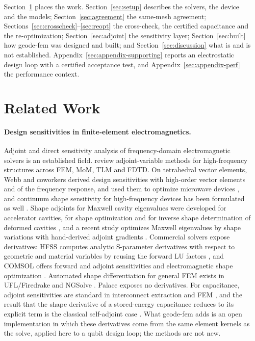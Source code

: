 \documentclass{anvil-paper}
\begin{document}
Section~\ref{sec:related} places the work. Section~\ref{sec:setup}
describes the solvers, the device and the models;
Section~\ref{sec:agreement} the same-mesh agreement;
Sections~\ref{sec:crosscheck}--\ref{sec:reopt} the cross-check, the
certified capacitance and the re-optimization;
Section~\ref{sec:adjoint} the sensitivity layer;
Section~\ref{sec:built} how geode-fem was designed and built; and
Section~\ref{sec:discussion} what is and is not established.
Appendix~\ref{sec:appendix-supporting} reports an electrostatic design
loop with a certified acceptance test, and
Appendix~\ref{sec:appendix-perf} the performance context.

\section{Related Work}
\label{sec:related}

\paragraph{Design sensitivities in finite-element electromagnetics.}
Adjoint and direct sensitivity analysis of frequency-domain
electromagnetic solvers is an established field. \citet{nikolova2004adjoint}
review adjoint-variable methods for high-frequency structures across FEM,
MoM, TLM and FDTD. On tetrahedral vector elements, Webb and coworkers
derived design sensitivities with high-order vector elements and of the
frequency response, and used them to optimize microwave devices
\citep{webb2001design,webb2002design,nair2003optimization}, and continuum
shape sensitivity for high-frequency devices has been formulated as well
\citep{choi2011generalized}. Shape adjoints for Maxwell cavity eigenvalues
were developed for accelerator cavities, for shape optimization
\citep{akcelik2005adjoint} and for inverse shape determination of
deformed cavities \citep{akcelik2008shape}, and a recent study
optimizes Maxwell eigenvalues by shape variations with hand-derived
adjoint gradients \citep{herter2026numerical}. Commercial solvers expose
derivatives: HFSS computes analytic S-parameter derivatives with respect
to geometric and material variables by reusing the forward LU factors
\citep{ansys_hfss_derivatives,vardapetyan2008sensitivity}, and COMSOL
offers forward and adjoint sensitivities and electromagnetic shape
optimization \citep{comsol_sensitivity_method,jensen2022comsolshape}.
Automated shape differentiation for general FEM exists in UFL/Firedrake
\citep{ham2019automated} and NGSolve \citep{gangl2021fully}. Palace exposes
no derivatives. For capacitance, adjoint sensitivities are standard in
interconnect extraction \citep{elmoselhy2008efficient} and FEM
\citep{ren2012computation}, and the result that the shape derivative of a
stored-energy capacitance reduces to its explicit term is the classical
self-adjoint case \citep{park2019continuum}. What geode-fem adds is an
open implementation in which these derivatives come from the same element
kernels as the solve, applied here to a qubit design loop; the methods
are not new.
\end{document}
